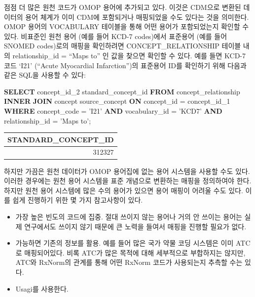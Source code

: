 \documentclass[10.5pt]{book}
\newenvironment{Shaded}{\begin{snugshade}}{\end{snugshade}}
\newcommand{\KeywordTok}[1]{\textcolor[rgb]{0.13,0.29,0.53}{\textbf{#1}}}
\newcommand{\DecValTok}[1]{\textcolor[rgb]{0.00,0.00,0.81}{#1}}
\newcommand{\StringTok}[1]{\textcolor[rgb]{0.31,0.60,0.02}{#1}}
\newcommand{\NormalTok}[1]{#1}
\providecommand{\tightlist}{%
  \setlength{\itemsep}{0pt}\setlength{\parskip}{0pt}}
\theoremstyle{definition}
\theoremstyle{definition}
\theoremstyle{definition}
\theoremstyle{remark}
\begin{document}
점점 더 많은 원천 코드가 OMOP 용어에 추가되고 있다. 이것은 CDM으로
변환된 데이터의 용어 체계가 이미 CDM에 포함되거나 매핑되었을 수도 있다는
것을 의미한다. OMOP 용어의 VOCABULARY 테이블을 통해 어떤 용어가
포함되었는지 확인할 수 있다. 비표준인 원천 용어 (예를 들어 KCD-7
codes)에서 표준용어 (예를 들어 SNOMED codes)로의 매핑을 확인하려면
CONCEPT\_RELATIONSHIP 테이블 내의 relationship\_id = ``Maps to'' 인 값을
찾으면 확인할 수 있다. 예를 들면 KCD-7 코드 `I21' (``Acute Myocardial
Infarction'')의 표준용어 ID를 확인하기 위해 다음과 같은 SQL을 사용할 수
있다:

\begin{Shaded}
\begin{Highlighting}[]
\KeywordTok{SELECT}\NormalTok{ concept_id_2 standard_concept_id}
\KeywordTok{FROM}\NormalTok{ concept_relationship}
\KeywordTok{INNER} \KeywordTok{JOIN}\NormalTok{ concept source_concept}
  \KeywordTok{ON}\NormalTok{ concept_id = concept_id_}\DecValTok{1}
\KeywordTok{WHERE}\NormalTok{ concept_code = }\StringTok{'I21'}
  \KeywordTok{AND}\NormalTok{ vocabulary_id = }\StringTok{'KCD7'}
  \KeywordTok{AND}\NormalTok{ relationship_id = }\StringTok{'Maps to'}\NormalTok{;}
\end{Highlighting}
\end{Shaded}

\begin{longtable}[]{@{}r@{}}
\toprule
STANDARD\_CONCEPT\_ID\tabularnewline
\midrule
\endhead
312327\tabularnewline
\bottomrule
\end{longtable}

하지만 가끔은 원천 데이터가 OMOP 용어집에 없는 용어 시스템을 사용할 수도
있다. 이러한 경우에는 원천 용어 시스템을 표준 개념으로 변환하는 매핑을
정의하여야 한다. 하지만 원천 용어 시스템에 많은 수의 용어가 있으면 용어
매핑이 어려울 수도 있다. 이를 쉽게 진행하기 위한 몇 가지 참고사항이
있다.

\begin{itemize}
\tightlist
\item
  가장 높은 빈도의 코드에 집중. 절대 쓰이지 않는 용어나 거의 안 쓰이는
  용어는 실제 연구에서도 쓰이지 않기 때문에 큰 노력을 들여서 매핑을
  진행할 필요가 없다.
\item
  가능하면 기존의 정보를 활용. 예를 들어 많은 국가 약물 코딩 시스템은
  이미 ATC로 매핑되어있다. 비록 ATC가 많은 목적에 대해 세부적으로
  부합하지는 않지만, ATC와 RxNorm의 관계를 통해 어떤 RxNorm 코드가
  사용되는지 추측할 수는 있다.
\item
  Usagi를 사용한다.
\end{itemize}
\end{document}
